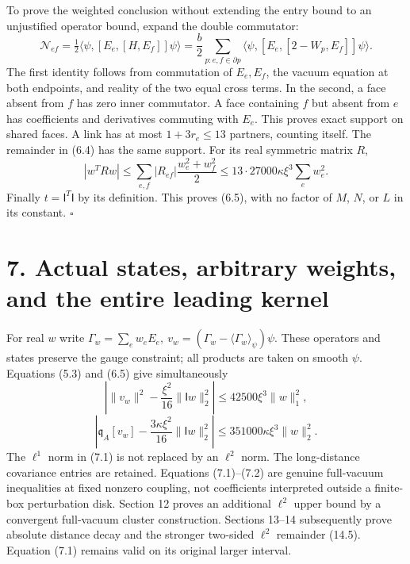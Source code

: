 \documentclass[
]{article}
\begin{document}
To prove the weighted conclusion without extending the entry bound to an
unjustified operator bound, expand the double commutator: \[
\mathcal N_{ef}
 =\tfrac12\langle\psi,[E_e,[H,E_f]]\psi\rangle
 =\frac b2\sum_{p:e,f\in\partial p}
 \langle\psi,[E_e,[2-W_p,E_f]]\psi\rangle.                     \tag{6.6}
\] The first identity follows from commutation of \(E_e,E_f\), the
vacuum equation at both endpoints, and reality of the two equal cross
terms. In the second, a face absent from \(f\) has zero inner
commutator. A face containing \(f\) but absent from \(e\) has
coefficients and derivatives commuting with \(E_e\). This proves exact
support on shared faces. A link has at most \(1+3r_e\le13\) partners,
counting itself. The remainder in (6.4) has the same support. For its
real symmetric matrix \(R\), \[
|w^TRw|\le\sum_{e,f}|R_{ef}|\frac{w_e^2+w_f^2}{2}
 \le13\cdot27000\kappa\xi^3\sum_ew_e^2.
\] Finally \(t=\mathsf I^T\mathsf I\) by its definition. This proves
(6.5), with no factor of \(M\), \(N\), or \(L\) in its constant.
\(\square\)

\section{7. Actual states, arbitrary weights, and the entire leading
kernel}\label{actual-states-arbitrary-weights-and-the-entire-leading-kernel}

For real \(w\) write
\(\Gamma_w=\sum_ew_eE_e,\ v_w=(\Gamma_w-\langle\Gamma_w\rangle_\psi)\psi\).
These operators and states preserve the gauge constraint; all products
are taken on smooth \(\psi\). Equations (5.3) and (6.5) give
simultaneously \[
\left|\|v_w\|^2-\frac{\xi^2}{16}\|\mathsf Iw\|_2^2\right|
 \le42500\xi^3\|w\|_1^2,                                    \tag{7.1}
\] \[
\left|\mathfrak q_A[v_w]-\frac{3\kappa\xi^2}{16}\|\mathsf Iw\|_2^2\right|
 \le351000\kappa\xi^3\|w\|_2^2.                              \tag{7.2}
\] The \(\ell^1\) norm in (7.1) is not replaced by an \(\ell^2\) norm.
The long-distance covariance entries are retained. Equations
(7.1)--(7.2) are genuine full-vacuum inequalities at fixed nonzero
coupling, not coefficients interpreted outside a finite-box perturbation
disk. Section 12 proves an additional \(\ell^2\) upper bound by a
convergent full-vacuum cluster construction. Sections 13--14
subsequently prove absolute distance decay and the stronger two-sided
\(\ell^2\) remainder (14.5). Equation (7.1) remains valid on its
original larger interval.
\end{document}
